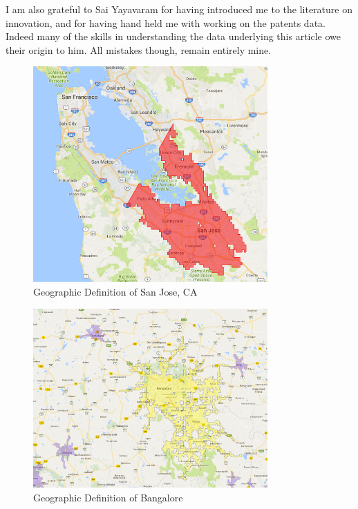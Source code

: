 \documentclass[12pt]{article}
\begin{document}
I am also grateful to Sai Yayavaram for having introduced me to the literature on innovation, and for having hand held me with working on the patents data. Indeed many of the skills in understanding the data underlying this article owe their origin to him. All mistakes though, remain entirely mine.

\newpage
 


\appendix
\singlespacing
\normalsize
\newpage
\begin{figure}[h!]
\begin{centering}
  \includegraphics[width=0.8\textwidth]{SanJose}
  \caption{Geographic Definition of San Jose, CA}
   \label{fig:SanJose}
\end{centering}
\end{figure}

\begin{figure}[h!]
\begin{centering}
  \includegraphics[width=0.8\textwidth]{Bangalore}
  \caption{Geographic Definition of Bangalore}
   \label{fig:Bangalore}
\end{centering}
\end{figure}
\newpage
\end{document}
